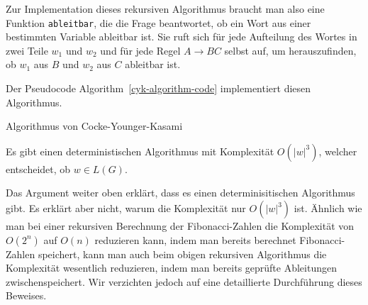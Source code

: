 Zur Implementation dieses rekursiven Algorithmus braucht man
also eine Funktion {\tt ableitbar}, die die Frage beantwortet,
ob ein Wort aus einer bestimmten Variable ableitbar ist. Sie
ruft sich für jede Aufteilung des Wortes in zwei Teile
$w_1$ und $w_2$ und für jede Regel $A\to BC$ selbst auf, um
herauszufinden, ob $w_1$ aus $B$ und $w_2$ aus $C$ ableitbar ist.

Der Pseudocode Algorithm~\ref{cyk-algorithm-code} implementiert
diesen Algorithmus.
\begin{algorithm}
\caption{Algorithmus von Cocke-Younger-Kasami\label{cyk-algorithm-code}}
\end{algorithm}


\begin{satz}
%
%
%
\label{cyk-algorithm}
Es gibt einen deterministischen Algorithmus mit Komplexität
$O(|w|^3)$, welcher entscheidet, ob $w\in L(G)$.
\end{satz}

Das Argument weiter oben erklärt, dass es einen determinisitischen
Algorithmus gibt. Es erklärt aber nicht, warum die Komplexität
nur $O(|w|^3)$ ist. Ähnlich wie man bei einer rekursiven Berechnung
der Fibonacci-Zahlen die Komplexität von $O(2^n)$ auf $O(n)$ reduzieren
kann, indem man bereits berechnet Fibonacci-Zahlen speichert, kann
man auch beim obigen rekursiven Algorithmus die Komplexität wesentlich
reduzieren, indem man bereits geprüfte Ableitungen zwischenspeichert.
Wir verzichten jedoch auf eine detaillierte Durchführung dieses
Beweises.

